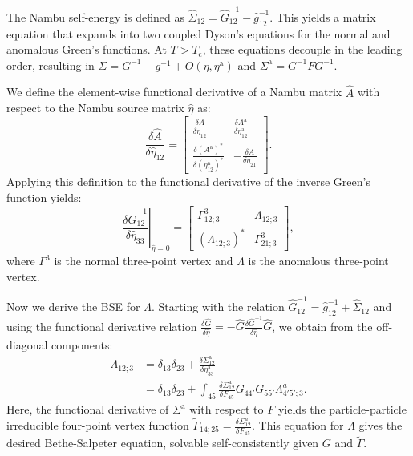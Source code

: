 \documentclass[%
 reprint,
superscriptaddress,
 amsmath,amssymb,
 aps,
prx,
]{revtex4-2}
\newcommand{\Gammapp}{\tilde{\Gamma}}
\newcommand{\txa}{\text{a}}
\newcommand{\txc}{\text{c}}
\newcommand{\nambu}[1]{\hat{#1}}
\begin{document}
\begin{appendices}
The Nambu self-energy is defined as
$\nambu{\Sigma}_{12}=\nambu{G}^{-1}_{12}-\nambu{g}^{-1}_{12}$.
This yields a matrix equation that expands into two coupled Dyson's equations for the normal and anomalous Green's functions.
At $T>T_\txc$, these equations decouple in the leading order, resulting in
$\Sigma= G^{-1}-g^{-1} + O(\eta,\eta^\txa)$ 
and $\Sigma^\txa= G^{-1}FG^{-1}$.

We define the element-wise functional derivative of a Nambu matrix $\nambu{A}$ with respect to the Nambu source matrix $\nambu{\eta}$ as:
\begin{equation}
    \frac{\delta \nambu{A}}{\delta{\nambu{\eta}}_{12}}
    =
    \begin{bmatrix}
        \frac{\delta A}{\delta \eta_{12}} & \frac{\delta A^\txa}{\delta \eta^\txa_{12}}\\
        \frac{\delta \left(A^\txa\right)^*}{\delta \left(\eta^\txa_{12}\right)^*} & -\frac{\delta A}{\delta \eta_{21}}
    \end{bmatrix}.
\end{equation}
Applying this definition to the functional derivative of the inverse Green's function yields:
\begin{equation}
    \left.\frac{\delta\nambu{G}_{12}^{-1}}{\delta\nambu{\eta}_{33}}\right\vert_{\nambu{\eta}=0}
    =
    \begin{bmatrix}
        \Gamma^3_{12;3} & \Lambda_{12;3}\\
        \left(\Lambda_{12;3}\right)^* & \Gamma^3_{21;3}
    \end{bmatrix},
\end{equation}
where $\Gamma^3$ is the normal three-point vertex and
$\Lambda$ is the anomalous three-point vertex.

Now we derive the BSE for $\Lambda$.
Starting with the relation $\nambu{G}^{-1}_{12}=\nambu{g}^{-1}_{12}+\nambu{\Sigma}_{12}$ and using the functional derivative relation $\frac{\delta \nambu{G}}{\delta \nambu{\eta}} = -\nambu{G}\frac{\delta \nambu{G}^{-1}}{\delta \nambu{\eta}}\nambu{G}$, we obtain from the off-diagonal components:
\begin{align}
    \Lambda_{12;3} &= \delta_{13}\delta_{23}+\frac{\delta\Sigma^\txa_{12}}{\delta\eta^\txa_{33}}\nonumber\\
    &=\delta_{13}\delta_{23}+\int_{45}\frac{\delta \Sigma^\txa_{12}}{\delta F_{45}}G_{44'}G_{55'}\Lambda^a_{4'5';3}.
    \label{eq:lambda}
\end{align}
Here, the functional derivative of $\Sigma^\txa$ with respect to $F$ yields the particle-particle irreducible four-point vertex function $\Gammapp_{14;25}=\frac{\delta \Sigma^a_{12}}{\delta F_{45}}$.
This equation for $\Lambda$ gives the desired Bethe-Salpeter equation, solvable self-consistently given $G$ and $\Gammapp$.



\end{appendices}
\end{document}
